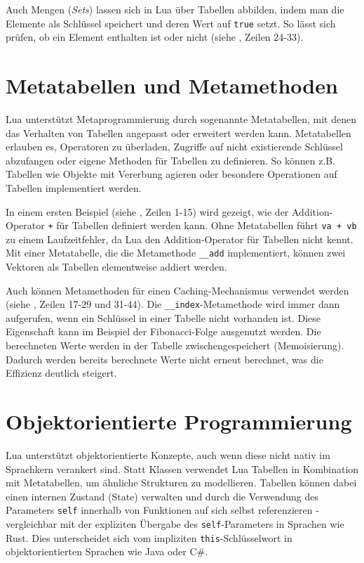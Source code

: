 \documentclass[11pt,a4paper]{article}
\begin{document}
Auch Mengen (\textit{Sets}) lassen sich in Lua über Tabellen abbilden, indem man die Elemente als Schlüssel speichert und deren Wert auf \lstinline|true| setzt.
So lässt sich prüfen, ob ein Element enthalten ist oder nicht (siehe , Zeilen 24-33).

\section*{Metatabellen und Metamethoden}

Lua unterstützt Metaprogrammierung durch sogenannte Metatabellen, mit denen das Verhalten von Tabellen angepasst oder erweitert werden kann.
Metatabellen erlauben es, Operatoren zu überladen, Zugriffe auf nicht existierende Schlüssel abzufangen oder eigene Methoden für Tabellen zu definieren.
So können z.B. Tabellen wie Objekte mit Vererbung agieren oder besondere Operationen auf Tabellen implementiert werden.

In einem ersten Beispiel (siehe , Zeilen 1-15) wird gezeigt, wie der Addition-Operator \colorbox{codegray}{\lstinline|+|} für Tabellen definiert werden kann.
Ohne Metatabellen führt \colorbox{codegray}{\lstinline|va + vb|} zu einem Laufzeitfehler, da Lua den Addition-Operator für Tabellen nicht kennt.
Mit einer Metatabelle, die die Metamethode \lstinline|__add| implementiert, können zwei Vektoren als Tabellen elementweise addiert werden.

Auch können Metamethoden für einen Caching-Mechanismus verwendet werden (siehe , Zeilen 17-29 und 31-44).
Die \lstinline|__index|-Metamethode wird immer dann aufgerufen, wenn ein Schlüssel in einer Tabelle nicht vorhanden ist.
Diese Eigenschaft kann im Beispiel der Fibonacci-Folge ausgenutzt werden. Die berechneten Werte werden in der Tabelle zwischengespeichert (Memoisierung).
Dadurch werden bereits berechnete Werte nicht erneut berechnet, was die Effizienz deutlich steigert.

\section*{Objektorientierte Programmierung}

Lua unterstützt objektorientierte Konzepte, auch wenn diese nicht nativ im Sprachkern verankert sind.
Statt Klassen verwendet Lua Tabellen in Kombination mit Metatabellen, um ähnliche Strukturen zu modellieren.
Tabellen können dabei einen internen Zustand (State) verwalten und durch die Verwendung des Parameters \texttt{self}
innerhalb von Funktionen auf sich selbst referenzieren - vergleichbar mit der expliziten Übergabe des \texttt{self}-Parameters in Sprachen wie Rust.
Dies unterscheidet sich vom impliziten \texttt{this}-Schlüsselwort in objektorientierten Sprachen wie Java oder C\#.
\end{document}
